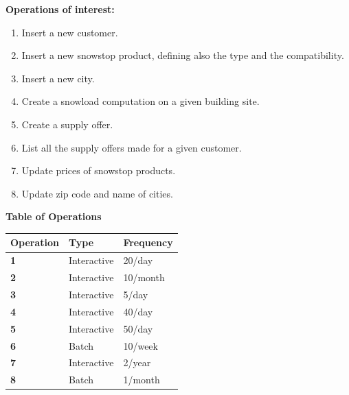 \documentclass{article}[h]
\begin{document}
\pagebreak

\textbf{Operations of interest:}
\begin{enumerate}
  \item Insert a new customer.
  \item Insert a new snowstop product, defining also the type and the compatibility.
  \item Insert a new city.
  \item Create a snowload computation on a given building site.
  \item Create a supply offer.
  \item List all the supply offers made for a given customer.
  \item Update prices of snowstop products.
  \item Update zip code and name of cities.
\end{enumerate}

\vspace{12px}

{\centering \textbf{Table of Operations}\\}

\begin{table}[H]
  \def\arraystretch{1.25}%
  \centering
  \begin{tabular}{ | m{2.5cm} | m{3.5cm}| m{3.5cm} |}  
    \hline
    {\textbf{\large Operation}} & {\textbf{\large Type}} & {\textbf{\large Frequency}} \\ 
    \hline
    \color[HTML]{3531FF} \textbf{1} & Interactive & 20/day  \\ 
    \hline
    \color[HTML]{3531FF} \textbf{2} & Interactive & 10/month  \\ 
    \hline
    \color[HTML]{3531FF} \textbf{3} & Interactive & 5/day  \\ 
    \hline
    \color[HTML]{3531FF} \textbf{4} & Interactive & 40/day  \\ 
    \hline
    \color[HTML]{3531FF} \textbf{5} & Interactive & 50/day  \\ 
    \hline
    \color[HTML]{3531FF} \textbf{6} & Batch & 10/week  \\ 
    \hline
    \color[HTML]{3531FF} \textbf{7} & Interactive & 2/year  \\ 
    \hline
    \color[HTML]{3531FF} \textbf{8} & Batch & 1/month  \\ 
    \hline
  \end{tabular}
\end{table}
\end{document}
